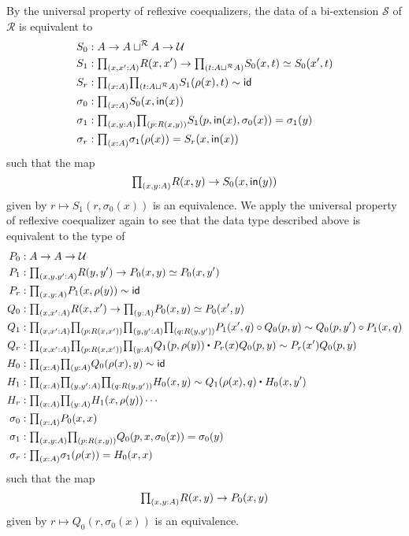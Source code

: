 By the universal property of reflexive coequalizers, the data of a bi-extension $\mathcal{S}$ of $\mathcal{R}$ is equivalent to
\begin{align*}
S_0 & : A \to A\sqcup^{\mathcal{R}} A \to \UU \\
S_1 & : \prd{x,x':A} R(x,x')\to \prd{t:A\sqcup^\mathcal{R}A} S_0(x,t) \simeq S_0(x',t) \\
S_r & : \prd{x:A}{t:A\sqcup^{\mathcal{R}} A} S_1(\rho(x),t)\htpy \idfunc \\
\sigma_0 & : \prd{x:A} S_0(x,\mathsf{in}(x)) \\
\sigma_1 & : \prd{x,y:A}{p:R(x,y)} S_1(p,\mathsf{in}(x),\sigma_0(x))=\sigma_1(y) \\
\sigma_r & : \prd{x:A} \sigma_1(\rho(x))=S_r(x,\mathsf{in}(x))
\end{align*}
such that the map
\begin{equation*}
\prd{x,y:A}R(x,y)\to S_0(x,\mathsf{in}(y))
\end{equation*}
given by $r\mapsto S_1(r,\sigma_0(x))$ is an equivalence. We apply the universal property of reflexive coequalizer again to see that the data type described above is equivalent to the type of
\begin{align*}
P_0 & : A \to A \to \UU \\
P_1 & : \prd{x,y,y':A} R(y,y')\to P_0(x,y) \simeq P_0(x,y') \\
P_r & : \prd{x,y:A} P_1(x,\rho(y))\htpy \idfunc \\
Q_0 & : \prd{x,x':A} R(x,x')\to \prd{y:A} P_0(x,y) \simeq P_0(x',y) \\
Q_1 & : \prd{x,x':A}{p:R(x,x')}{y,y':A}{q:R(y,y')} P_1(x',q)\circ Q_0(p,y)\htpy Q_0(p,y')\circ P_1(x,q) \\
Q_r & : \prd{x,x':A}{p:R(x,x')}{y:A} \ct{Q_1(p,\rho(y))}{P_r(x)Q_0(p,y)} \htpy P_r(x')Q_0(p,y) \\
H_0 & : \prd{x:A}{y:A} Q_0(\rho(x),y)\htpy \idfunc \\
H_1 & : \prd{x:A}{y,y':A}{q:R(y,y')} H_0(x,y)\htpy \ct{Q_1(\rho(x),q)}{H_0(x,y')} \\
H_r & : \prd{x:A}{y:A} H_1(x,\rho(y)) \cdots \\
\sigma_0 & : \prd{x:A} P_0(x,x) \\
\sigma_1 & : \prd{x,y:A}{p:R(x,y)} Q_0(p,x,\sigma_0(x))=\sigma_0(y) \\
\sigma_r & : \prd{x:A} \sigma_1(\rho(x))=H_0(x,x)
\end{align*}
such that the map
\begin{equation*}
\prd{x,y:A}R(x,y)\to P_0(x,y)
\end{equation*}
given by $r\mapsto Q_0(r,\sigma_0(x))$ is an equivalence.

